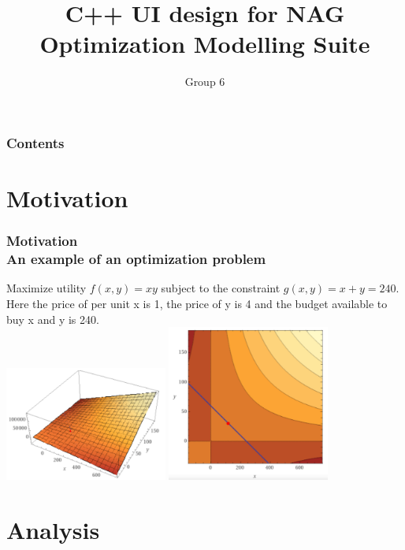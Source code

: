 \documentclass[ucs,10pt]{beamer}
\begin{document}
\title[{\tt info@stce.rwth-aachen.de}]{\textcolor{rwth-blue}{C++ UI design for NAG Optimization Modelling Suite} }
\author[Talk (Template)]{Group 6} 
\date[]{}

\begin{frame}[plain]
\titlepage
\end{frame}

\begin{frame}
	\frametitle{Contents}
\vspace{1em}
\tableofcontents
\end{frame}

\section{Motivation}
\begin{frame}
\frametitle{Motivation\\ 
\small\color{rwth-blue} An example of an optimization problem}
Maximize utility ${\displaystyle f(x,y)=xy}$ subject to the constraint ${\displaystyle g(x,y)=x+y=240}$. Here the price of per unit x is 1, the price of y is 4 and the budget available to buy x and y is 240.\\
\includegraphics[width=0.4\textwidth]{prob1.png}
\hspace{1cm}
\includegraphics[width=0.4\textwidth]{prob2.png}
\end{frame}

\section{Analysis}
\end{document}
